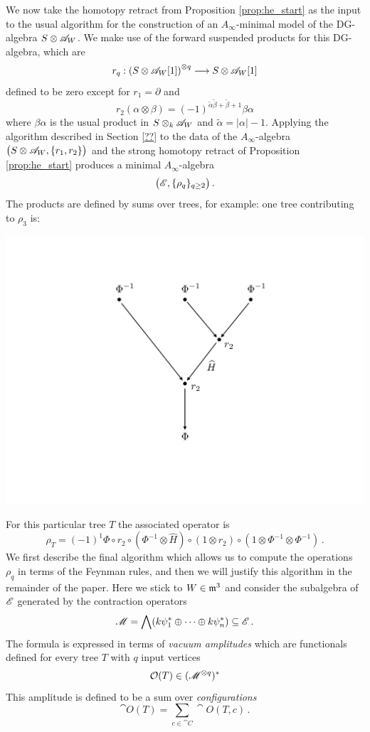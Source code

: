 \documentclass[english,letter paper,12pt,leqno]{article}
\theoremstyle{example}
\numberwithin{equation}{section}
\def\be{\begin{equation}}
\def\ee{\end{equation}}
\begin{document}
We now take the homotopy retract from Proposition \ref{prop:he_start} as the input to the usual algorithm for the construction of an $A_\infty$-minimal model of the DG-algebra $S \otimes \mathscr{A}_W$. We make use of the forward suspended products for this DG-algebra, which are
\be
r_q: \left( S \otimes \md{A}_W [1] \right)^{\otimes q} \lto S \otimes \md{A}_W[1]
\ee
defined to be zero except for $r_1 = \partial$ and 
\be
r_2( \alpha \otimes \beta ) = (-1)^{\widetilde{\alpha} \widetilde{\beta} + \widetilde{\beta} + 1} \beta \alpha
\ee
where $\beta \alpha$ is the usual product in $S \otimes_ k \mathscr{A}_W$ and $\widetilde{\alpha} = |\alpha| - 1$. Applying the algorithm described in Section \ref{??} to the data of the $A_\infty$-algebra $\big( S \otimes \mathscr{A}_W, \{ r_1, r_2 \} \big)$ and the strong homotopy retract of Proposition \ref{prop:he_start} produces a minimal $A_\infty$-algebra
\[
\big( \mathscr{E}, \{ \rho_q \}_{q \ge 2} \big)\,.
\]
The products are defined by sums over trees, for example: one tree contributing to $\rho_3$ is:
\begin{center}
\includegraphics[scale=0.35]{diagram-1}
\end{center}
For this particular tree $T$ the associated operator is
\[
\rho_T = (-1)^1 \Phi \circ r_2 \circ ( \Phi^{-1} \otimes \widehat{H} ) \circ ( 1 \otimes r_2 ) \circ (1 \otimes \Phi^{-1} \otimes \Phi^{-1} ) \,.
\]
We first describe the final algorithm which allows us to compute the operations $\rho_q$ in terms of the Feynman rules, and then we will justify this algorithm in the remainder of the paper. Here we stick to $W \in \mathfrak{m}^3$ and consider the subalgebra of $\mathscr{E}$ generated by the contraction operators
\[
\mathscr{M} = \bigwedge( k\psi_1^* \oplus \cdots \oplus k \psi_n^* ) \subseteq \mathscr{E}\,.
\]
The formula is expressed in terms of \emph{vacuum amplitudes} which are functionals defined for every tree $T$ with $q$ input vertices
\[
\mathcal{O}(T) \in (\mathscr{M}^{\otimes q})^*
\]
This amplitude is defined to be a sum over \emph{configurations}
\[
\cat{O}(T) = \sum_{c \in \cat{C}} \cat{O}(T, c)\,.
\]
\newpage
\end{document}

